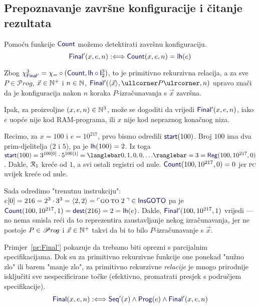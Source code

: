 \subsection{Prepoznavanje završne konfiguracije i čitanje rezultata}

Pomoću funkcije $\f{Count}$ možemo detektirati završnu konfiguraciju.
\begin{equation}
    \f{Final}'(x,e,n):\Longleftrightarrow\f{Count}(x,e,n)\eq\f{lh}(e)
\end{equation}

Zbog $\chi_{\f{Final}'}^3=\chi_\eq\circ(\f{Count},\f{lh}\circ\f I_2^3)$, to je primitivno rekurzivna relacija, a za sve $P\in\mathscr Prog$, $\vec x\in{\mathbb N}^+$ i $n\in{\mathbb N}$, $\f{Final}'(\langle\vec x\rangle,\kprog P,n)$ upravo znači da je konfiguracija nakon $n$ koraka $P$-izračunavanja s $\vec x$ završna.

Ipak, za proizvoljne $(x,e,n)\in{\mathbb N}^3$, može se dogoditi da vrijedi $\f{Final}'(x,e,n)$, iako $e$ uopće nije kod RAM-programa, ili $x$ nije kod nepraznog konačnog niza.

\begin{primjer}[{name=[neintuitivnost parcijalno specificiranih relacija]}]\label{pr:Final'}
Recimo, za $x=100$ i $e=10^{217}$, prvo bismo odredili
$\f{start}(100)$. Broj $100$ ima dva prim-djelitelja ($2$ i $5$), pa je $\f{lh}(100)=2$. Iz toga $\f{start}(100)=3^{100[0]}\cdot5^{100[1]}=\knk{0,1,0,0,\dotsc}=3=\f{Reg}(100,10^{217},0)$. Dakle, $\mathcal R_{1}$ kreće od $1$, a svi ostali registri od nule.  $\f{Count}(100,10^{217},0)=0$ jer \textsc{pc} uvijek kreće od nule.

	Sada odredimo "trenutnu instrukciju": $e[0]=216=2^3\cdot3^3=\langle2,2\rangle=\kins{\goto\;2\,}\in\f{InsGOTO}$ pa je $\f{Count}(100,10^{217},1)=\f{dest}(216)=2=\f{lh}(e)$. Dakle, $\f{Final}'(100,10^{217},1)$ vrijedi --- no nema smisla reći da to reprezentira zaustavljanje nekog iz\-ra\-ču\-na\-va\-nja, jer ne postoje $P\in\mathscr Pr\mspace{-1mu}o\mspace{-2mu}g$ i $\vec x\in{\mathbb N}^+$ takvi da bi to bilo $P$-izračunavanje s $\vec x$.
\end{primjer}

Primjer~\ref{pr:Final'} pokazuje da trebamo biti oprezni s parcijalnim specifikacijama. Dok su za primitivno rekurzivne funkcije one ponekad "nužno zlo" ili barem "manje zlo", za primitivno rekurzivne \emph{relacije} je mnogo prirodnije isključiti sve nespecificirane točke (efektivno, promatrati presjek s područjem specifikacije).
\begin{equation}
\f{Final}(x,e,n):\Longleftrightarrow\f{Seq'}(x)\land\f{Prog}(e)\land\f{Final}'(x,e,n)
\end{equation}


